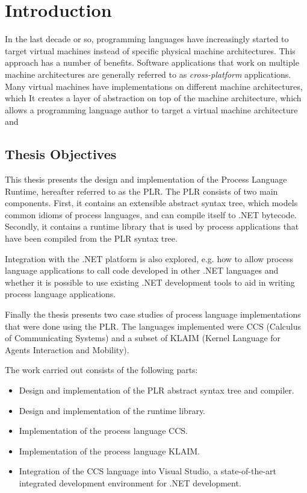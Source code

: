 \chapter{Introduction}

In the last decade or so, programming languages have increasingly started to target virtual machines instead of specific physical machine architectures. This approach has a number of benefits. Software applications that work on multiple machine architectures are generally referred to as \textit{cross-platform} applications. 
Many virtual machines have implementations on different machine architectures, which 
It creates a layer of abstraction on top of the machine architecture, which allows a programming language author to target a virtual machine architecture and  

\section{Thesis Objectives}

This thesis presents the design and implementation of the Process Language Runtime, hereafter referred to as the PLR. The PLR consists of two main components. First, it contains an extensible abstract syntax tree, which models common idioms of process languages, and can compile itself to .NET bytecode. Secondly, it contains a runtime library that is used by process applications that have been compiled from the PLR syntax tree. 

Integration with the .NET platform is also explored, e.g. how to allow process language applications to call code developed in other .NET languages and whether it is possible to use existing .NET development tools to aid in writing process language applications.

Finally the thesis presents two case studies of process language implementations that were done using the PLR. The languages implemented were CCS (Calculus of Communicating Systems) and a subset of KLAIM (Kernel Language for Agents Interaction and Mobility).

The work carried out consists of the following parts:

\begin{itemize}
  \item Design and implementation of the PLR abstract syntax tree and compiler.
  \item Design and implementation of the runtime library.
  \item Implementation of the process language CCS.
  \item Implementation of the process language KLAIM.
  \item Integration of the CCS language into Visual Studio, a state-of-the-art 
  			integrated development environment for .NET development.
\end{itemize}


